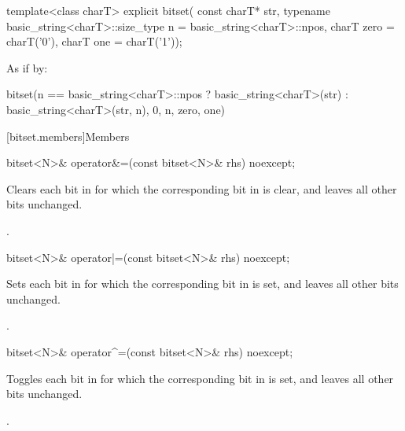 %
\begin{itemdecl}
template<class charT>
  explicit bitset(
    const charT* str,
    typename basic_string<charT>::size_type n = basic_string<charT>::npos,
    charT zero = charT('0'),
    charT one = charT('1'));
\end{itemdecl}

\begin{itemdescr}
\pnum
\effects
As if by:
\begin{codeblock}
bitset(n == basic_string<charT>::npos
          ? basic_string<charT>(str)
          : basic_string<charT>(str, n),
       0, n, zero, one)
\end{codeblock}
\end{itemdescr}


[bitset.members]{Members}

%
\begin{itemdecl}
bitset<N>& operator&=(const bitset<N>& rhs) noexcept;
\end{itemdecl}

\begin{itemdescr}
\pnum
\effects
Clears each bit in
for which the corresponding bit in  is clear, and leaves all other bits unchanged.

\pnum
\returns
{}.
\end{itemdescr}

%
\begin{itemdecl}
bitset<N>& operator|=(const bitset<N>& rhs) noexcept;
\end{itemdecl}

\begin{itemdescr}
\pnum
\effects
Sets each bit in
for which the corresponding bit in  is set, and leaves all other bits unchanged.

\pnum
\returns
{}.
\end{itemdescr}

%
\begin{itemdecl}
bitset<N>& operator^=(const bitset<N>& rhs) noexcept;
\end{itemdecl}

\begin{itemdescr}
\pnum
\effects
Toggles each bit in
for which the corresponding bit in  is set, and leaves all other bits unchanged.

\pnum
\returns
{}.
\end{itemdescr}


